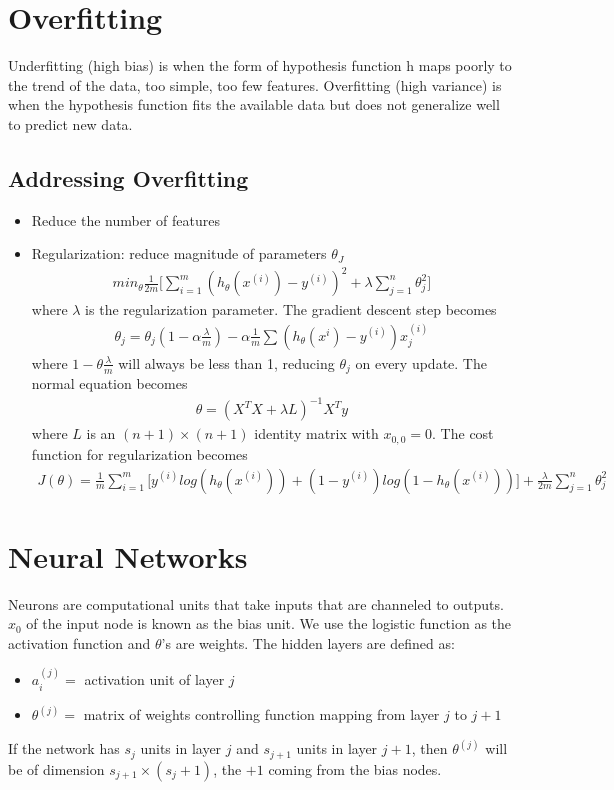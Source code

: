 \documentclass[12pt]{article}
\begin{document}
\section{Overfitting}
Underfitting (high bias) is when the form of hypothesis function h maps poorly to the trend of the data, too simple, too few features. Overfitting (high variance) is when the hypothesis function fits the available data but does not generalize well to predict new data.
\subsection{Addressing Overfitting}
\begin{itemize}
	\item Reduce the number of features
    \item Regularization: reduce magnitude of parameters $\theta_J$ \begin{align*}
		min_\theta \frac{1}{2m}\bigg[\sum_{i=1}^{m}(h_\theta(x^{(i)})-y^{(i)})^2 + \lambda\sum_{j=1}^{n}\theta_j^2\bigg]
	\end{align*} where $\lambda$ is the regularization parameter. The gradient descent step becomes \begin{align*}
		\theta_j = \theta_j (1-\alpha\frac{\lambda}{m})-\alpha\frac{1}{m}\sum (h_\theta(x^{i})-y^{(i)})x_j^{(i)}
	\end{align*} where $1-\theta\frac{\lambda}{m}$ will always be less than 1, reducing $\theta_j$ on every update. The normal equation becomes \begin{align*}
		\theta = (X^TX + \lambda L)^{-1}X^Ty
	\end{align*} where $L$ is an $(n+1)\times (n+1)$ identity matrix with $x_{0,0}=0$. The cost function for regularization becomes \begin{align*}
		J(\theta) = \frac{1}{m}\sum_{i=1}^{m}\bigg[y^{(i)}log(h_\theta(x^{(i)}))+(1-y^{(i)})log(1-h_\theta(x^{(i)}))\bigg]+\frac{\lambda}{2m}\sum_{j=1}^{n}\theta_j^2
	\end{align*}
    \label{sec:regularization}
\end{itemize}

\section{Neural Networks}
Neurons are computational units that take inputs that are channeled to outputs. $x_0$ of the input node is known as the bias unit. We use the logistic function as the activation function and $\theta$'s are weights.
The hidden layers are defined as:
\begin{itemize}
	\item $a_i^{(j)} =$ activation unit of layer $j$
	\item $\theta^{(j)} =$ matrix of weights controlling function mapping from layer $j$ to $j+1$
\end{itemize}
If the network has $s_j$ units in layer $j$ and $s_{j+1}$ units in layer $j+1$, then $\theta^{(j)}$ will be of dimension $s_{j+1}\times (s_j+1)$, the $+1$ coming from the bias nodes.
\end{document}
